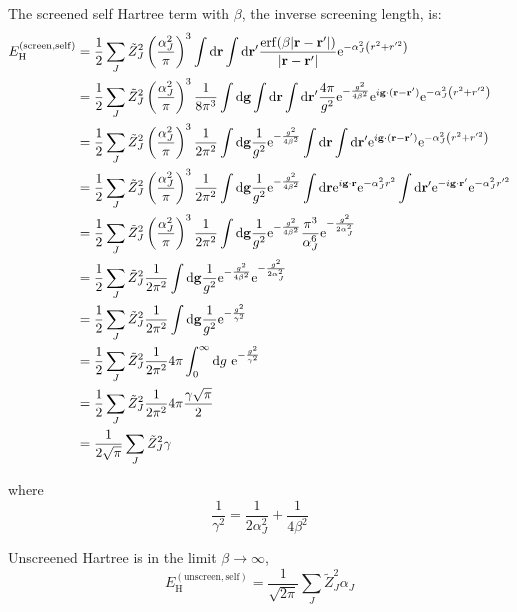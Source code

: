 \documentclass[paper=a4, fontsize=11pt]{article} %
\numberwithin{equation}{section} %
\numberwithin{figure}{section} %
\numberwithin{table}{section} %
\newcommand{\bg}{{\bf{g}}}
\newcommand{\br}{{\bf{r}}}
\newcommand{\re}{{\mathrm{e}}}
\newcommand{\rerf}{{\mathrm{erf}}}
\newcommand{\rd}{{\mathrm{d}}}
\newcommand{\rH}{{\mathrm{H}}}
\newcommand{\al}{{\alpha}}
\begin{document}
The screened self Hartree term with $\beta$, the inverse screening length, is:
\begin{equation}
\begin{split}
E_{\rH}^{(\mathrm{screen,self})} 
&= \frac{1}{2}\sum_J \tilde Z_J^2 \left(\frac{\al_J^2}{\pi}\right)^3 \int \rd \br \int \rd \br'  \frac{\rerf(\beta|\br - \br'|)}{|\br-\br'|}\re^{-\al_J^2 \left(r^2+r'^2\right)}\\
&= \frac{1}{2}\sum_J \tilde Z_J^2 \left(\frac{\al_J^2}{\pi}\right)^3 \frac{1}{8\pi^3}\int \rd \bg \int \rd \br \int \rd \br'  \frac{4\pi}{g^2} \re^{-\frac{g^2}{4\beta^2}} \re^{i\bg\cdot(\br - \br')}\re^{-\al_J^2 \left(r^2+r'^2\right)}\\
&= \frac{1}{2}\sum_J \tilde Z_J^2 \left(\frac{\al_J^2}{\pi}\right)^3 \frac{1}{2\pi^2}\int \rd \bg \frac{1}{g^2} \re^{-\frac{g^2}{4\beta^2}}  \int \rd \br \int \rd \br'  \re^{i\bg\cdot(\br - \br')}\re^{-\al_J^2 \left(r^2+r'^2\right)}\\
&= \frac{1}{2}\sum_J \tilde Z_J^2 \left(\frac{\al_J^2}{\pi}\right)^3 \frac{1}{2\pi^2}\int \rd \bg \frac{1}{g^2} \re^{-\frac{g^2}{4\beta^2}}  \int \rd \br  \re^{i\bg\cdot\br}\re^{-\al_J^2 r^2} \int \rd \br'  \re^{-i\bg\cdot\br'}\re^{-\al_J^2 r'^2}\\
&= \frac{1}{2}\sum_J \tilde Z_J^2 \left(\frac{\al_J^2}{\pi}\right)^3 \frac{1}{2\pi^2}\int \rd \bg \frac{1}{g^2} \re^{-\frac{g^2}{4\beta^2}}  \frac{\pi^3}{\al_J^6} \re^{-\frac{g^2}{2\al_J^2}}\\
&= \frac{1}{2}\sum_J \tilde Z_J^2 \frac{1 }{2\pi^2}\int \rd \bg \frac{1}{g^2} \re^{-\frac{g^2}{4\beta^2}} \re^{-\frac{g^2}{2\al_J^2}}\\
&= \frac{1}{2}\sum_J \tilde Z_J^2 \frac{1 }{2\pi^2}\int \rd \bg \frac{1}{g^2} \re^{-\frac{g^2}{\gamma^2}} \\
&= \frac{1}{2}\sum_J \tilde Z_J^2 \frac{1 }{2\pi^2}4\pi \int_0^\infty \rd g\ \re^{-\frac{g^2}{\gamma^2}}\\
&= \frac{1}{2}\sum_J \tilde Z_J^2 \frac{1 }{2\pi^2}4\pi \frac{\gamma\sqrt{\pi}}{2}\\
&= \frac{1}{2\sqrt{\pi}}\sum_J \tilde Z_J^2 \gamma
\end{split}
\end{equation}

where
\begin{equation}
\frac{1}{\gamma^2} = \frac{1}{2\al_J^2} + \frac{1}{4\beta^2}
\end{equation}

Unscreened Hartree is in the limit $\beta \rightarrow \infty$,
\begin{equation}
E_{\rH}^{(\mathrm{unscreen,self})} 
= \frac{1}{\sqrt{2\pi}}\sum_J \tilde Z_J^2 \al_J
\end{equation}
\end{document}
